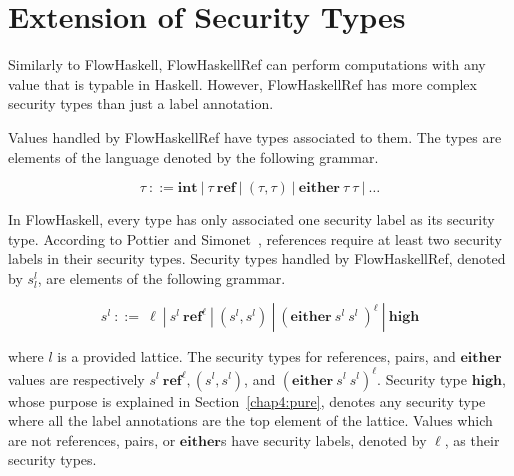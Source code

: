 \documentclass{report}
\newcommand{\sts}[1]{s_{#1}^l}
\newcommand{\st}{s^l}
\newcommand{\typ}{\tau}
\begin{document}
\section{Extension of Security Types}

\label{chap4:CSL}



Similarly to FlowHaskell,  FlowHaskellRef can perform computations
with any value that is typable in Haskell. However, FlowHaskellRef has more complex security types than
just a label annotation.

Values handled by FlowHaskellRef have types associated to them. The
types are elements of the language denoted by the following grammar.

\begin{equation}
\label{fig:types} 
\typ\ ::= \mathbf{int} \ | \ \typ\ \mathbf{ref}\ |\ (\typ,\typ)\ |\
\mathbf{either}\ \typ\ \typ \ | \ \dots 
\end{equation} 


In FlowHaskell, every type has only associated one security label as
its security type. According to Pottier and Simonet~\cite{Pottier:Simonet:POPL02}, 
references require at least two security labels in their security
types. Security types handled by FlowHaskellRef, denoted by $\sts{l}$, are 
elements of the following grammar.

\begin{equation}
\label{fig:cst} 
\st\ ::=\ \ell\ |\ \st\ {\mathbf{ref}}^{\ell}\ |\ (\st,\st)\ |\ ({\mathbf{either}}\ \st\ \st\ )^{\ell}\ |\ {\mathbf{high}}
\end{equation} 


where $l$ is a provided lattice. The security types for references,
pairs, and $\mathbf{either}$ values are respectively  
$\st\ {\mathbf{ref}}^{\ell},(\st,\st)$, and 
$({\mathbf{either}}\ \st\ \st)^{\ell}$. Security type $\mathbf{high}$, 
whose purpose is explained in Section~\ref{chap4:pure}, denotes
any security type where all the label annotations are the top element
of the lattice. Values which are not references, pairs,
or $\mathbf{either}$s have security labels, denoted by $\ell$, as
their security types. 
\end{document}
